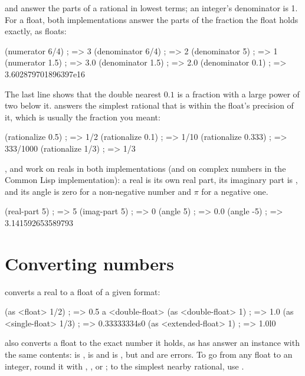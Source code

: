  and  answer the parts of a rational
in lowest terms; an integer's denominator is 1. For a float, both
implementations answer the parts of the fraction the float holds exactly,
as floats:

\begin{dylan}
(numerator 6/4)       ; => 3
(denominator 6/4)     ; => 2
(denominator 5)       ; => 1
(numerator 1.5)       ; => 3.0
(denominator 1.5)     ; => 2.0
(denominator 0.1)     ; => 3.602879701896397e16
\end{dylan}

\noindent The last line shows that the double nearest $0.1$ is a fraction
with a large power of two below it.  answers the
simplest rational that is within the float's precision of it, which is
usually the fraction you meant:

\begin{dylan}
(rationalize 0.5)     ; => 1/2
(rationalize 0.1)     ; => 1/10
(rationalize 0.333)   ; => 333/1000
(rationalize 1/3)     ; => 1/3
\end{dylan}

,  and  work on reals in
both implementations (and on complex numbers in the Common Lisp
implementation): a real is its own real part, its imaginary part is
, and its angle is zero for a non-negative number and $\pi$ for a
negative one.

\begin{dylan}
(real-part 5)    ; => 5
(imag-part 5)    ; => 0
(angle 5)        ; => 0.0
(angle -5)       ; => 3.141592653589793
\end{dylan}

\section{Converting numbers}\label{sec:numbers-conversion}

 converts a real to a float of a given format:

\begin{dylan}
(as <float> 1/2)           ; => 0.5        a <double-float>
(as <double-float> 1)      ; => 1.0
(as <single-float> 1/3)    ; => 0.33333334s0
(as <extended-float> 1)    ; => 1.0l0
\end{dylan}

\noindent {} also converts a float to the exact number it holds,
as  has  answer an instance with the
same contents:  is ,
 is  and 
is , but  and  are errors. To go from any float to an integer, round it with
, ,  or ; to the
simplest nearby rational, use .

